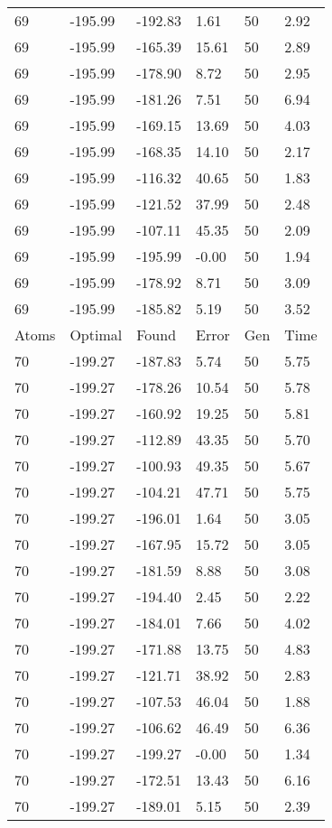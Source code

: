 \documentclass{report}
\begin{document}
\begin{appendix}
\begin{longtable}{llllll}
69 & -195.99 & -192.83 & 1.61 & 50 & 2.92 \\
69 & -195.99 & -165.39 & 15.61 & 50 & 2.89 \\
69 & -195.99 & -178.90 & 8.72 & 50 & 2.95 \\
69 & -195.99 & -181.26 & 7.51 & 50 & 6.94 \\
69 & -195.99 & -169.15 & 13.69 & 50 & 4.03 \\
69 & -195.99 & -168.35 & 14.10 & 50 & 2.17 \\
69 & -195.99 & -116.32 & 40.65 & 50 & 1.83 \\
69 & -195.99 & -121.52 & 37.99 & 50 & 2.48 \\
69 & -195.99 & -107.11 & 45.35 & 50 & 2.09 \\
69 & -195.99 & -195.99 & -0.00 & 50 & 1.94 \\
69 & -195.99 & -178.92 & 8.71 & 50 & 3.09 \\
69 & -195.99 & -185.82 & 5.19 & 50 & 3.52 \\
Atoms & Optimal & Found & Error & Gen & Time \\
70 & -199.27 & -187.83 & 5.74 & 50 & 5.75 \\
70 & -199.27 & -178.26 & 10.54 & 50 & 5.78 \\
70 & -199.27 & -160.92 & 19.25 & 50 & 5.81 \\
70 & -199.27 & -112.89 & 43.35 & 50 & 5.70 \\
70 & -199.27 & -100.93 & 49.35 & 50 & 5.67 \\
70 & -199.27 & -104.21 & 47.71 & 50 & 5.75 \\
70 & -199.27 & -196.01 & 1.64 & 50 & 3.05 \\
70 & -199.27 & -167.95 & 15.72 & 50 & 3.05 \\
70 & -199.27 & -181.59 & 8.88 & 50 & 3.08 \\
70 & -199.27 & -194.40 & 2.45 & 50 & 2.22 \\
70 & -199.27 & -184.01 & 7.66 & 50 & 4.02 \\
70 & -199.27 & -171.88 & 13.75 & 50 & 4.83 \\
70 & -199.27 & -121.71 & 38.92 & 50 & 2.83 \\
70 & -199.27 & -107.53 & 46.04 & 50 & 1.88 \\
70 & -199.27 & -106.62 & 46.49 & 50 & 6.36 \\
70 & -199.27 & -199.27 & -0.00 & 50 & 1.34 \\
70 & -199.27 & -172.51 & 13.43 & 50 & 6.16 \\
70 & -199.27 & -189.01 & 5.15 & 50 & 2.39 \\

\end{longtable}
\end{appendix}
\end{document}
